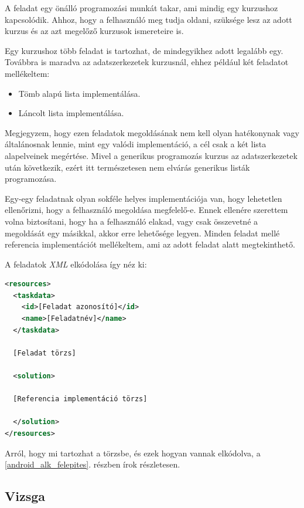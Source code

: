 \documentclass[12pt,a4paper]{article}
\newcommand{\xml}{\textit{XML}\xspace}
\begin{document}
	A feladat egy önálló programozási munkát takar, ami mindig egy kurzushoz kapcsolódik. Ahhoz, hogy a felhasználó meg tudja oldani, szüksége lesz az adott kurzus és az azt megelőző kurzusok ismereteire is.
	
	Egy kurzushoz több feladat is tartozhat, de mindegyikhez adott legalább egy. Továbbra is maradva az adatszerkezetek kurzusnál, ehhez például két feladatot mellékeltem:
	
	\begin{itemize}
		\item Tömb alapú lista implementálása.
		\item Láncolt lista implementálása.
	\end{itemize}

	Megjegyzem, hogy ezen feladatok megoldásának nem kell olyan hatékonynak vagy általánosnak lennie, mint egy valódi implementáció, a cél csak a két lista alapelveinek megértése. Mivel a generikus programozás kurzus az adatszerkezetek után következik, ezért itt természetesen nem elvárás generikus listák programozása.

	Egy-egy feladatnak olyan sokféle helyes implementációja van, hogy lehetetlen ellenőrizni, hogy a felhasználó megoldása megfelelő-e. Ennek ellenére szerettem volna biztosítani, hogy ha a felhasználó elakad, vagy csak összevetné a megoldását egy másikkal, akkor erre lehetősége legyen. Minden feladat mellé referencia implementációt mellékeltem, ami az adott feladat alatt megtekinthető.

	A feladatok \xml elkódolása így néz ki:
	
	\bigskip
	\begin{lstlisting}[language=XML]
<resources>
  <taskdata>
    <id>[Feladat azonosító]</id>
    <name>[Feladatnév]</name>
  </taskdata>
  
  [Feladat törzs]
  	
  <solution>
  
  [Referencia implementáció törzs]
  
  </solution>
</resources>
	\end{lstlisting}
	\bigskip

	Arról, hogy mi tartozhat a törzsbe, és ezek hogyan vannak elkódolva, a \ref{android_alk_felepites}. részben írok részletesen.

	\subsection{Vizsga}\label{vizsga}
	
\end{document}
